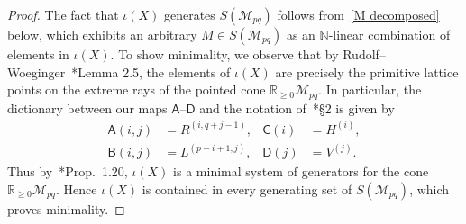 \documentclass[noamsfonts,10pt]{amsart}
\newcommand{\N}{\mathbb{N}}
\newcommand{\R}{\mathbb{R}}
\newcommand{\M}{\mathcal{M}}
\newcommand{\sA}{\mathsf{A}}
\newcommand{\sB}{\mathsf{B}}
\newcommand{\sC}{\mathsf{C}}
\newcommand{\sD}{\mathsf{D}}
\newcommand{\1}{\mathbf{1}}
\theoremstyle{plain}
\theoremstyle{definition}
\numberwithin{equation}{section}
\begin{document}
    \begin{proof}
        The fact that $\iota(X)$ generates $S(\M_{pq})$ follows from~\eqref{M decomposed} below, which exhibits an arbitrary $M \in S(\M_{pq})$ as an $\N$-linear combination of elements in $\iota(X)$.
        To show minimality, we observe that by Rudolf--Woeginger~\cite{RW95}*{Lemma 2.5}, the elements of $\iota(X)$ are precisely the primitive lattice points on the extreme rays of the pointed cone $\R_{\geq 0} \M_{pq}$.
        In particular, the dictionary between our maps $\sA$--$\sD$ and the notation of~\cite{RW95}*{\S2} is given by
        \begin{align*}
            \sA(i,j) &= R^{(i, q+j-1)}, &
            \sC(i) &= H^{(i)}, \\
            \sB(i,j)  &= L^{(p-i+1, j)}, &
            \sD(j) &= V^{(j)}.
        \end{align*}
        Thus by~\cite{BrunsGubeladze}*{Prop.~1.20}, $\iota(X)$ is a minimal system of generators for the cone $\R_{\geq 0} \M_{pq}$.
        Hence $\iota(X)$ is contained in every generating set of $S(\M_{pq})$, which proves minimality.
    \end{proof}
    
\end{document}
